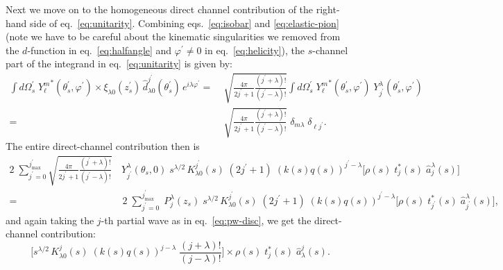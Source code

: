 \documentclass[10pt, aps,prd,amsmath,amssymb,superscriptaddress,onecolumn,
nofootinbib,showpacs,preprintnumbers]{revtex4-1}
\newcommand{\jpmax}{{j^\prime_\text{max}}}
\begin{document}
Next we move on to the homogeneous direct channel contribution of the right-hand side of eq.~\ref{eq:unitarity}. Combining eqs.~\ref{eq:isobar} and \ref{eq:elastic-pion} (note we have to be careful about the kinematic singularities we removed from the \(d\)-function in eq.~\ref{eq:halfangle} and \(\varphi^\prime \not= 0\) in eq.~\ref{eq:helicity}), the \(s\)-channel part of the integrand in eq.~\ref{eq:unitarity} is given by:
  \begin{align}
      \label{eq:direct-channel-angle}
     \int d\Omega_s^\prime \; {Y^m_\ell}^*(\theta_s^\prime, \varphi^\prime) \times \xi_{\lambda0}(z_s^\prime) \, \hat{d}_{\lambda0}^{j^\prime}(\theta_s^\prime) \, e^{i\lambda \varphi^\prime} =&
     \; \sqrt{\frac{4\pi}{2j^\prime+1}\frac{(j^\prime+\lambda)!}{(j^\prime-\lambda)!}} \int d\Omega_s^\prime \; {Y^m_\ell}^*(\theta_s^\prime, \varphi^\prime) \;  Y^\lambda_{j^\prime}(\theta_s^\prime, \varphi^\prime) \nonumber \\
    =& \;  \sqrt{\frac{4\pi}{2j^\prime+1}\frac{(j^\prime+\lambda)!}{(j^\prime-\lambda)!}} \;  \delta_{m\lambda} \; \delta_{\ell j^\prime}.
  \end{align}
The entire direct-channel contribution then is
  \begin{align}
    2 \; \sum_{j^\prime=0}^\jpmax \sqrt{\frac{4\pi}{2j^\prime+1}\frac{(j^\prime+\lambda)!}{(j^\prime-\lambda)!}}& \, {Y^\lambda_{j^\prime}}(\theta_s,0) \; s^{\lambda/2} \,  K^{j^\prime}_{\lambda0}(s) \; (2j^\prime +1) \; (k(s)q(s))^{j^\prime - \lambda}
    \bigg[\rho(s) \; t^*_j(s) \; \hat{a}^\lambda_j(s) \bigg ] \nonumber \\
    =& \;  2\;  \sum_{j^\prime=0}^\jpmax \; P^\lambda_j(z_s) \; s^{\lambda/2} \, K^{j^\prime}_{\lambda0}(s)  \; (2j^\prime +1) \; (k(s)q(s))^{j^\prime - \lambda}
    \bigg[\rho(s) \; t^*_{j^\prime}(s) \; \hat{a}^\lambda_{j^\prime}(s) \bigg ],
  \end{align}
and again taking the \(j\)-th partial wave as in eq.~\ref{eq:pw-disc}, we get the direct-channel contribution:
  \begin{equation}
    \label{eq:pw-direct}
   \bigg[ s^{\lambda/2} \, K^j_{\lambda 0}(s) \; (k(s)q(s))^{j - \lambda} \; \frac{(j+\lambda)!}{(j- \lambda)!} \bigg] \times \rho(s) \; t^*_j(s) \; \hat{a}_\lambda^j(s).
  \end{equation}
\end{document}
